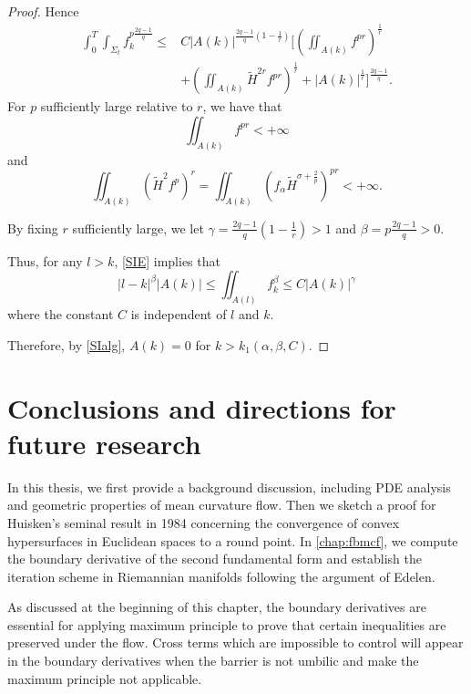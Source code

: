 \begin{proof}
    Hence
    \begin{equation*}
    \begin{split}
        \int_{0}^{T} \int_{\Sigma_t} f_{k}^{p \frac{2q-1}{q}} \leq &C \left| A(k) \right| ^{\frac{2q-1}{q}\left( 1-\frac{1}{r} \right) } [ \left( \iint_{A(k)}^{}f_{}^{pr}  \right) ^{\frac{1}{r}} \\
        &+ \left( \iint_{A(k)}^{}\tilde{H}^{2r} f_{}^{pr }  \right) ^{\frac{1}{r}}+\left| A(k) \right| ^{\frac{1}{r}} ] ^{\frac{2q-1}{q}}.
    \end{split}
    \end{equation*} 
    For $p$ sufficiently large relative to $r$, we have that 
    \[\iint_{A(k)}^{}f_{}^{pr } < + \infty \] and \[\iint_{A(k)}^{}\left( \tilde{H}^2f^p \right) ^r = \iint_{A(k)}^{}\left( f_{\alpha }\tilde{H}^{\sigma + \frac{2}{p}} \right) ^{pr}< + \infty .\]

    By fixing $r$ sufficiently large, we let $\gamma = \frac{2q-1}{q}\left( 1- \frac{1}{r} \right)>1 $ and $\beta = p \frac{2q-1}{q}>0 $.
    
    Thus, for any $l>k$, \autoref{SIE} implies that
    \[\left| l-k \right| ^{\beta }\left| A(k) \right| \leq \iint_{A(l)}^{}f_{k}^{\beta }  \leq C \left| A(k) \right| ^{\gamma }\]
    where the constant $C$ is independent of $l$ and $k$.

    Therefore, by \autoref{SIalg}, $A(k)=0$ for $k>k_1(\alpha , \beta , C)$. 
\end{proof}

\section{Conclusions and directions for future research}
In this thesis, we first provide a background discussion, including PDE analysis and geometric properties of mean curvature flow. Then we sketch a proof for Huisken’s seminal result in 1984 concerning the convergence of convex hypersurfaces in Euclidean spaces to a round point. In \autoref{chap:fbmcf}, we compute the boundary derivative of the second fundamental form and establish the iteration scheme in Riemannian manifolds following the argument of Edelen.

As discussed at the beginning of this chapter, the boundary derivatives are essential for applying maximum principle to prove that certain inequalities are preserved under the flow. Cross terms which are impossible to control will appear in the boundary derivatives when the barrier is not umbilic and make the maximum principle not applicable. 

